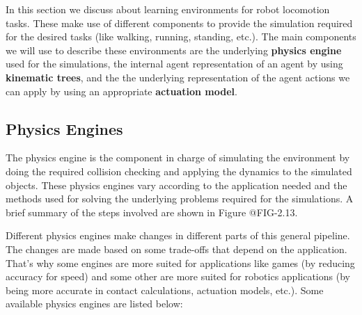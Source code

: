 In this section we discuss about learning environments for robot locomotion tasks.
These make use of different components to provide the simulation required for the desired
tasks (like walking, running, standing, etc.). The main components we will use
to describe these environments are the underlying \textbf{physics engine} used for the simulations, 
the internal agent representation of an agent by using \textbf{kinematic trees}, and the
the underlying representation of the agent actions we can apply by using an appropriate \textbf{actuation model}.

\subsection{Physics Engines}

The physics engine is the component in charge of simulating the environment by doing the
required collision checking and applying the dynamics to the simulated objects. These
physics engines vary according to the application needed and the methods used for solving
the underlying problems required for the simulations. A brief summary of the steps involved are
shown in Figure @FIG-2.13.

\figPhysicsEngineLoop

Different physics engines make changes in different parts of this general pipeline.
The changes are made based on some trade-offs that depend on the application. That's
why some engines are more suited for applications like games (by reducing accuracy for speed)
and some other are more suited for robotics applications (by being more accurate in 
contact calculations, actuation models, etc.). Some available physics engines are 
listed below:

